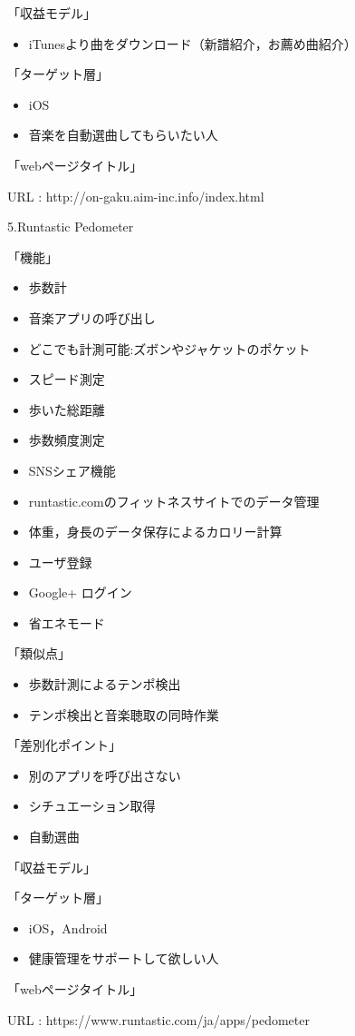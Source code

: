 「収益モデル」
\begin{itemize}
\item iTunesより曲をダウンロード（新譜紹介，お薦め曲紹介）
\end{itemize}

「ターゲット層」
\begin{itemize}
\item iOS
\item 音楽を自動選曲してもらいたい人
\end{itemize}
「webページタイトル」
\par
URL : http://on-gaku.aim-inc.info/index.html

\par
5.Runtastic Pedometer
\par
「機能」
\begin{itemize}
\item 歩数計
\item 音楽アプリの呼び出し
\item どこでも計測可能:ズボンやジャケットのポケット
\item スピード測定
\item 歩いた総距離
\item 歩数頻度測定
\item SNSシェア機能
\item runtastic.comのフィットネスサイトでのデータ管理
\item 体重，身長のデータ保存によるカロリー計算
\item ユーザ登録
\item Google+ ログイン
\item 省エネモード
\end{itemize}

「類似点」
\begin{itemize}
\item 歩数計測によるテンポ検出
\item テンポ検出と音楽聴取の同時作業
\end{itemize}

「差別化ポイント」
\begin{itemize}
\item 別のアプリを呼び出さない
\item シチュエーション取得
\item 自動選曲
\end{itemize}

「収益モデル」
\par
「ターゲット層」
\begin{itemize}
\item iOS，Android
\item 健康管理をサポートして欲しい人
\end{itemize}
「webページタイトル」
\par
URL : https://www.runtastic.com/ja/apps/pedometer

